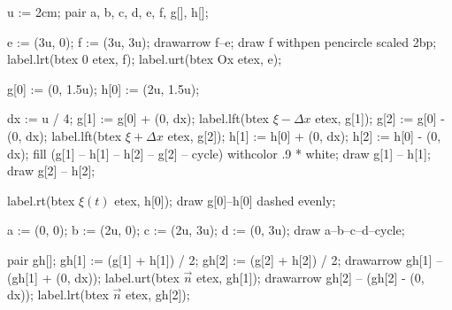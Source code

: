 u := 2cm;
pair a, b, c, d, e, f, g[], h[];

e := (3u, 0);
f := (3u, 3u);
drawarrow f--e;
draw f withpen pencircle scaled 2bp;
label.lrt(btex $0$ etex, f);
label.urt(btex Ox etex, e);

g[0] := (0, 1.5u);
h[0] := (2u, 1.5u);

dx := u / 4;
g[1] := g[0] + (0, dx);
label.lft(btex $\xi - \Delta x$ etex, g[1]);
g[2] := g[0] - (0, dx);
label.lft(btex $\xi + \Delta x$ etex, g[2]);
h[1] := h[0] + (0, dx);
h[2] := h[0] - (0, dx);
fill (g[1] -- h[1] -- h[2] -- g[2] -- cycle) withcolor .9 * white;
draw g[1] -- h[1];
draw g[2] -- h[2];

label.rt(btex $\xi(t)$ etex, h[0]);
draw g[0]--h[0] dashed evenly;

a := (0, 0);
b := (2u, 0);
c := (2u, 3u);
d := (0, 3u);
draw a--b--c--d--cycle;

pair gh[];
gh[1] := (g[1] + h[1]) / 2;
gh[2] := (g[2] + h[2]) / 2;
drawarrow gh[1] -- (gh[1] + (0, dx));
label.urt(btex $\vec n$ etex, gh[1]);
drawarrow gh[2] -- (gh[2] - (0, dx));
label.lrt(btex $\vec n$ etex, gh[2]);